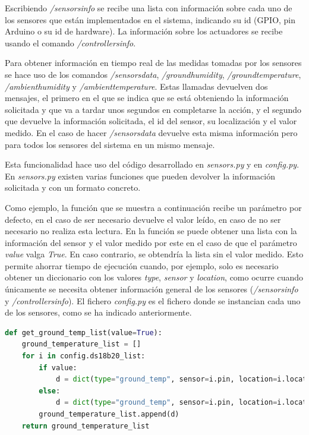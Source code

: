 \documentclass[a4paper, 12pt, oneside]{book}
\begin{document}
Escribiendo \textit{/sensorsinfo} se recibe una lista con información sobre cada uno de los sensores que están implementados en el sistema, indicando su id (GPIO, pin Arduino o su id de hardware). La información sobre los actuadores se recibe usando el comando \textit{/controllersinfo}.

Para obtener información en tiempo real de las medidas tomadas por los sensores se hace uso de los comandos \textit{/sensorsdata}, \textit{/groundhumidity}, \textit{/groundtemperature}, \textit{/ambienthumidity} y \textit{/ambienttemperature}. Estas llamadas devuelven dos mensajes, el primero en el que se indica que se está obteniendo la información solicitada y que va a tardar unos segundos en completarse la acción, y el segundo que devuelve la información solicitada, el id del sensor, su localización y el valor medido. En el caso de hacer \textit{/sensorsdata} devuelve esta misma información pero para todos los sensores del sistema en un mismo mensaje.

Esta funcionalidad hace uso del código desarrollado en \textit{sensors.py} y en \textit{config.py}. En \textit{sensors.py} existen varias funciones que pueden devolver la información solicitada y con un formato concreto. 

Como ejemplo, la función que se muestra a continuación recibe un parámetro por defecto, en el caso de ser necesario devuelve el valor leído, en caso de no ser necesario no realiza esta lectura.
En la función se puede obtener una lista con la información del sensor y el valor medido por este en el caso de que el parámetro \textit{value} valga \textit{True}. En caso contrario, se obtendría la lista sin el valor medido. 
Esto permite ahorrar tiempo de ejecución cuando, por ejemplo, solo es necesario obtener un diccionario con los valores \textit{type}, \textit{sensor} y \textit{location}, como ocurre cuando únicamente se necesita obtener información general de los sensores (\textit{/sensorsinfo} y \textit{/controllersinfo}).
El fichero \textit{config.py} es el fichero donde se instancian cada uno de los sensores, como se ha indicado anteriormente.

\begin{lstlisting}[language=Python]
def get_ground_temp_list(value=True):
    ground_temperature_list = []
    for i in config.ds18b20_list:
        if value:
            d = dict(type="ground_temp", sensor=i.pin, location=i.location, 		value=read_ground_temperature(i.pin))
        else:
            d = dict(type="ground_temp", sensor=i.pin, location=i.location)
        ground_temperature_list.append(d)
    return ground_temperature_list
\end{lstlisting}
\end{document}
